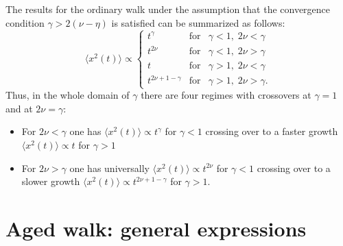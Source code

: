 The results for the ordinary walk under the assumption that the convergence condition $\gamma > 2(\nu-\eta)$ is satisfied can be summarized as follows: 
\begin{equation}
\langle x^2(t) \rangle \propto \left\{
  \begin{array}{lll}
  t^{\gamma} & \mathrm{for} & \gamma < 1, \; 2\nu < \gamma \\
t^{2\nu} & \mathrm{for} & \gamma < 1, \; 2\nu > \gamma \\
t & \mathrm{for} & \gamma > 1, \; 2\nu < \gamma \\
t^{2\nu+1- \gamma  } &\mathrm{for} &  \gamma > 1, \;2\nu > \gamma .
  \end{array}
  \right.
\label{balpoint}
\end{equation}
Thus, in the whole domain of $\gamma$ there are four regimes with crossovers at $\gamma = 1$ and at $2\nu = \gamma$:
\begin{itemize}
 \item For $2\nu < \gamma$ one has $\langle x^2(t) \rangle \propto t^{\gamma}$ for $\gamma <1$ crossing over to a faster growth $\langle x^2(t) \rangle \propto t$ for $\gamma > 1$
 \item For $2\nu > \gamma$ one has universally $\langle x^2(t) \rangle \propto t^{2\nu}$ for $\gamma <1$ crossing over to a slower growth $\langle x^2(t) \rangle \propto t^{2\nu+1-\gamma}$ for $\gamma > 1$.
\end{itemize}


\section{Aged walk: general expressions }
\label{Sec:Aged}


